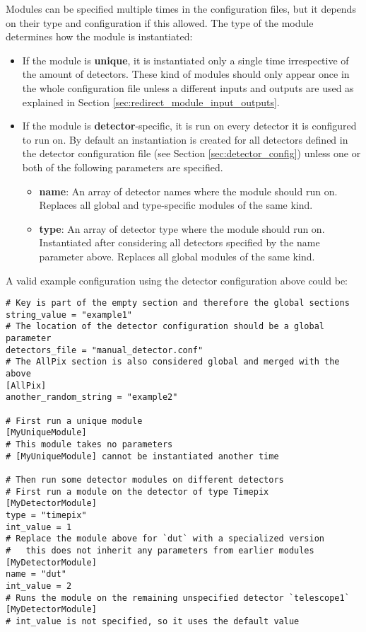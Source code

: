 Modules can be specified multiple times in the configuration files, but it depends on their type and configuration if this allowed. The type of the module determines how the module is instantiated:
\begin{itemize}
\item If the module is \textbf{unique}, it is instantiated only a single time irrespective of the amount of detectors. These kind of modules should only appear once in the whole configuration file unless a different inputs and outputs are used as explained in Section \ref{sec:redirect_module_input_outputs}.
\item If the module is \textbf{detector}-specific, it is run on every detector it is configured to run on. By default an instantiation is created for all detectors defined in the detector configuration file (see Section \ref{sec:detector_config}) unless one or both of the following parameters are specified.
\begin{itemize}
\item \textbf{name}: An array of detector names where the module should run on. Replaces all global and type-specific modules of the same kind.
\item \textbf{type}: An array of detector type where the module should run on. Instantiated after considering all detectors specified by the name parameter above. Replaces all global modules of the same kind. 
\end{itemize}
\end{itemize}

A valid example configuration using the detector configuration above could be:
\begin{verbatim}
# Key is part of the empty section and therefore the global sections
string_value = "example1"
# The location of the detector configuration should be a global parameter
detectors_file = "manual_detector.conf"
# The AllPix section is also considered global and merged with the above
[AllPix]
another_random_string = "example2"

# First run a unique module
[MyUniqueModule]
# This module takes no parameters
# [MyUniqueModule] cannot be instantiated another time

# Then run some detector modules on different detectors 
# First run a module on the detector of type Timepix
[MyDetectorModule]
type = "timepix"
int_value = 1
# Replace the module above for `dut` with a specialized version 
#   this does not inherit any parameters from earlier modules
[MyDetectorModule]
name = "dut"
int_value = 2
# Runs the module on the remaining unspecified detector `telescope1`
[MyDetectorModule]
# int_value is not specified, so it uses the default value
\end{verbatim}

